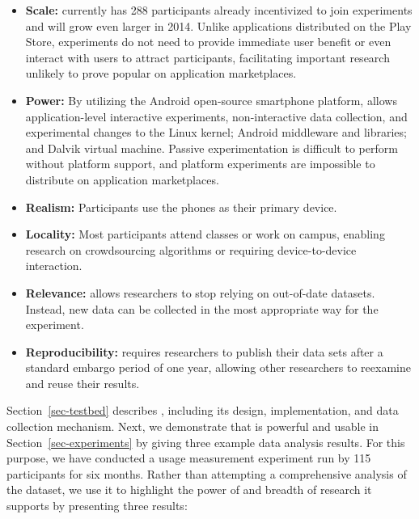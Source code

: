 \begin{itemize}

\item \textbf{Scale:} \PhoneLab{} currently has 288 participants already
incentivized to join experiments and will grow even larger in 2014. Unlike
applications distributed on the Play Store, \PhoneLab{} experiments do not
need to provide immediate user benefit or even interact with users to attract
participants, facilitating important research unlikely to prove popular on
application marketplaces.

\item \textbf{Power:} By utilizing the Android open-source smartphone
platform, \PhoneLab{} allows application-level interactive experiments,
non-interactive data collection, and experimental changes to the Linux
kernel; Android middleware and libraries; and Dalvik virtual machine. Passive
experimentation is difficult to perform without platform support, and
platform experiments are impossible to distribute on application
marketplaces.

\item \textbf{Realism:} Participants use the phones as their primary device.

\item \textbf{Locality:} Most participants attend classes or work on campus,
enabling research on crowdsourcing algorithms or requiring device-to-device
interaction.

\item \textbf{Relevance:} \PhoneLab{} allows researchers to stop relying on
out-of-date datasets. Instead, new data can be collected in the most
appropriate way for the experiment.

\item \textbf{Reproducibility:} \PhoneLab{} requires researchers to publish
their data sets after a standard embargo period of one year, allowing other
researchers to reexamine and reuse their results.

\end{itemize}

Section~\ref{sec-testbed} describes \PhoneLab{}, including its design,
implementation, and data collection mechanism. Next, we demonstrate that
\PhoneLab{} is powerful and usable in Section~\ref{sec-experiments} by giving
three example data analysis results. For this purpose, we have conducted a
usage measurement experiment run by 115 \PhoneLab{} participants for six
months. Rather than attempting a comprehensive analysis of the dataset, we
use it to highlight the power of \PhoneLab{} and breadth of research it
supports by presenting three results:

